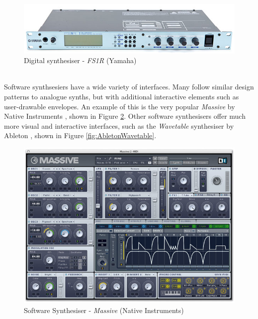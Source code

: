 \documentclass[11pt, oneside]{report}   	%
\begin{document}
%
\begin{figure}[h] 
	\centering
	\includegraphics[trim = {0, 0.2cm, 0, 0.5cm}, clip, width = 5in]{yamaha_fs1r.jpg}
	\caption{Digital synthesiser - \emph{FS1R} (Yamaha) \cite{FS1R}}
	\label{fig:YamahFS1R}
	\vspace{-10pt}
\end{figure}\\
Software synthsesiers have a wide variety of interfaces. Many follow similar design patterns to analogue synths, but with additional interactive elements such as user-drawable envelopes. An example of this is the very popular \emph{Massive} by Native Instruments \cite{Massive}, shown in Figure \ref{fig:MassiveNI}. Other software synthesisers offer much more visual and interactive interfaces, such as the \emph{Wavetable} synthesiser by Ableton \cite{Wavetable}, shown in Figure \ref{fig:AbletonWavetable}.

\begin{figure}[h] 
	\centering
	\includegraphics[width = 5in]{MassiveNI.jpg}
	\caption{Software Synthesiser - \emph{Massive} (Native Instruments) \cite{Massive}}
	\label{fig:MassiveNI}
\end{figure}
\end{document}
